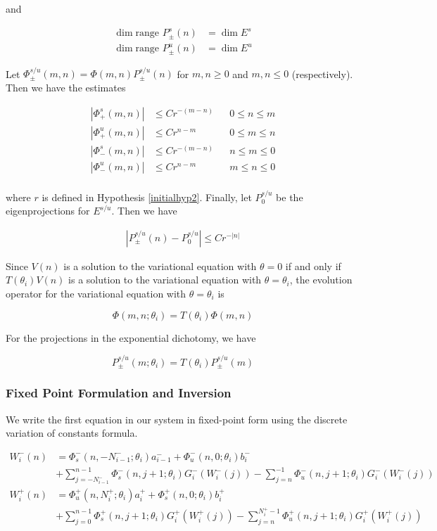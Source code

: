 \documentclass[12pt]{article}
\begin{document}
and

\begin{align*}
\dim \text{range }P_\pm^s(n) &= \dim E^s \\
\dim \text{range }P_\pm^u(n) &= \dim E^u
\end{align*}

Let $\Phi_\pm^{s/u}(m, n) = \Phi(m, n) P_\pm^{s/u}(n)$ for $m, n \geq 0$ and $m, n \leq 0$ (respectively). Then we have the estimates

\begin{align*}
|\Phi_+^s(m, n)| &\leq C r^{-(m - n)} && 0 \leq n \leq m \\
|\Phi_+^u(m, n)| &\leq C r^{n-m} && 0 \leq m \leq n \\
|\Phi_-^s(m, n)| &\leq C r^{-(m - n)} && n \leq m \leq 0 \\
|\Phi_-^u(m, n)| &\leq C r^{n-m} && m \leq n \leq 0\\
\end{align*}

where $r$ is defined in Hypothesis \ref{initialhyp2}. Finally, let $P_0^{s/u}$ be the eigenprojections for $E^{s/u}$. Then we have

\begin{align}\label{projbound}
| P_\pm^{s/u}(n) - P_0^{s/u} | \leq C r^{-|n|}
\end{align}

Since $V(n)$ is a solution to the variational equation with $\theta = 0$ if and only if $T(\theta_i) V(n)$ is a solution to the variational equation with $\theta = \theta_i$, the evolution operator for the variational equation with $\theta = \theta_i$ is

\[
\Phi(m, n; \theta_i) = T(\theta_i) \Phi(m,n)
\]

For the projections in the exponential dichotomy, we have

\[
P_\pm^{s/u}(m; \theta_i) = T(\theta_i) P_\pm^{s/u}(m)
\]

\subsubsection{Fixed Point Formulation and Inversion}

We write the first equation in our system in fixed-point form using the discrete variation of constants formula.

\begin{align*}
W_i^-(n) &= 
\Phi_s^-(n, -N_{i-1}^-; \theta_i) a_{i-1}^- + \Phi_u^-(n, 0; \theta_i) b_i^-  \\
&+ \sum_{j = -N_{i-1}^-}^{n-1} \Phi_s^-(n, j+1; \theta_i) G_i^-(W_i^-(j)) - \sum_{j = n}^{-1} \Phi_u^-(n, j+1; \theta_i) G_i^-(W_i^-(j)) \\
W_i^+(n) &= \Phi_u^+(n, N_i^+; \theta_i) a_i^+ + \Phi_s^+(n, 0; \theta_i) b_i^+ \\
&+ \sum_{j = 0}^{n-1} \Phi_s^+(n, j+1; \theta_i) G_i^+(W_i^+(j)) 
- \sum_{j = n}^{N_i^+-1} \Phi_u^+(n, j+1; \theta_i) G_i^+(W_i^+(j))
\end{align*}
\end{document}
